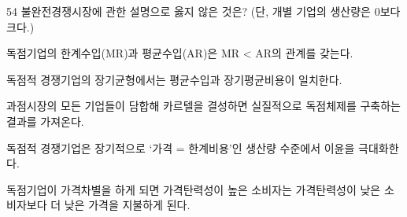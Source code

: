 \begin{question}{54}
불완전경쟁시장에 관한 설명으로 옳지 않은 것은? (단, 개별 기업의 생산량은 0보다 크다.)
\begin{choices}
  \item 독점기업의 한계수입(MR)과 평균수입(AR)은 MR < AR의 관계를 갖는다.
  \item 독점적 경쟁기업의 장기균형에서는 평균수입과 장기평균비용이 일치한다.
  \item 과점시장의 모든 기업들이 담합해 카르텔을 결성하면 실질적으로 독점체제를 구축하는 결과를 가져온다.
  \item 독점적 경쟁기업은 장기적으로 ‘가격 = 한계비용’인 생산량 수준에서 이윤을 극대화한다.
  \item 독점기업이 가격차별을 하게 되면 가격탄력성이 높은 소비자는 가격탄력성이 낮은 소비자보다 더 낮은 가격을 지불하게 된다.
\end{choices}
\end{question}
